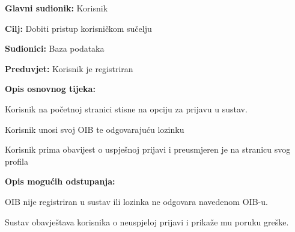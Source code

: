 					\noindent {}
					\begin{packed_item}
						
						\item \textbf{Glavni sudionik: }Korisnik
						\item  \textbf{Cilj:} Dobiti pristup korisničkom sučelju
						\item  \textbf{Sudionici:} Baza podataka
						\item  \textbf{Preduvjet:} Korisnik je registriran
						\item  \textbf{Opis osnovnog tijeka:}
						
						\item[] \begin{packed_enum}
							
							\item Korisnik na početnoj stranici stisne na opciju za prijavu u sustav.
							\item Korisnik unosi svoj OIB te odgovarajuću lozinku
							\item Korisnik prima obavijest o uspješnoj prijavi i preusmjeren je na stranicu svog profila
						\end{packed_enum}
						
						\item  \textbf{Opis mogućih odstupanja:}
						
						\item[] \begin{packed_item}
							
							\item[2.a] OIB nije registriran u sustav ili lozinka ne odgovara navedenom OIB-u.
							\item[] \begin{packed_enum}
								
								\item Sustav obavještava korisnika o neuspjeloj prijavi i prikaže mu poruku greške.
		
								
							\end{packed_enum}
							
						\end{packed_item}
					\end{packed_item}
					
